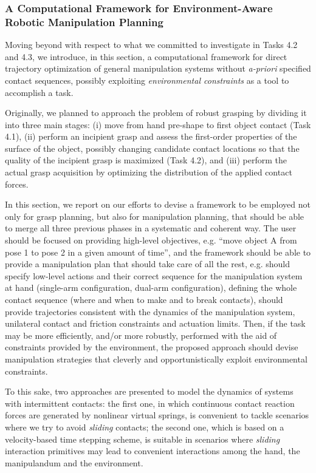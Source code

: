 
\subsubsection{A Computational Framework for Environment-Aware Robotic Manipulation Planning}

Moving beyond with respect to what we committed to investigate in Tasks 4.2 and 4.3, we introduce, in this section, a computational framework for direct trajectory optimization of general manipulation systems without \textsl{a-priori} specified contact sequences, possibly exploiting \emph{environmental constraints} as a tool to accomplish a task.
 
 Originally, we planned to approach the problem of robust grasping by dividing it into three main stages: (i) move from hand pre-shape to first object contact (Task 4.1), (ii) perform an incipient grasp and assess the first-order properties of the surface of the object, possibly changing candidate contact locations so that the quality of the incipient grasp is maximized (Task 4.2), and (iii) perform the actual grasp acquisition by optimizing the distribution of the applied contact forces.
 
 In this section, we report on our efforts to devise a framework to be employed not only for grasp planning, but also for manipulation planning, that should be able to merge all three previous phases in a systematic and coherent way. The user should be focused on providing high-level objectives, e.g. ``move object A from pose 1 to pose 2 in a given amount of time'', and the framework should be able to provide a manipulation plan that should take care of all the rest, e.g. should specify low-level actions and their correct sequence for the manipulation system at hand (single-arm configuration, dual-arm configuration),  defining the whole contact sequence (where and when to make and to break contacts), should provide trajectories consistent with the dynamics of the manipulation system, unilateral contact and friction constraints and actuation limits. Then, if the task may be more efficiently, and/or more robustly, performed with the aid of constraints provided by the environment, the proposed approach should devise manipulation strategies that cleverly and opportunistically exploit environmental constraints.
 
 To this sake, two approaches are presented to model the dynamics of systems with intermittent contacts: the first one, in which continuous contact reaction forces are generated  by nonlinear virtual springs, is convenient to tackle scenarios where we try to avoid \emph{sliding} contacts; the second one, which is based on a velocity-based time stepping scheme, is suitable in scenarios where \emph{sliding} interaction primitives may lead to convenient interactions among the hand, the manipulandum and the environment.

